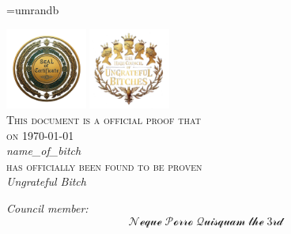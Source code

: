 \documentclass[landscape,a4paper,12pt]{article}
\def\bitchname{{name\_of\_bitch}} %
\def\dateofcert{\today} %
\def\nameofcouncilmember{{Neque\;Porro\;Quisquam\;the\;3rd}}
\begin{document}
\pagecolor{yellow!10}
\centering
\begin{minipage}{1.0\textwidth}
\font\border=umrandb
\generalframe
{\border {}} %
{\border {}} %
{\border {}} %
{\border {}} %
{\border {}} %
{\border {}} %
{\border {}} %
{\border {}} %
{\centering
  \includegraphics[width=0.2\textwidth]{seal_of_certification.png}
  \includegraphics[width=0.2\textwidth]{backgroundless_ungrateful.png}\\[0.5cm]
  \textsc{\Large This document is a official proof that}\\[0.5cm]
  \textsc{\Large on} {\Large {\dateofcert}}\\[1cm]
  
  {\huge \itshape \bitchname}\\[1cm]
  
  \textsc{\Large has officially been found to be proven}\\[1cm]
  
  {\LARGE \itshape Ungrateful Bitch}\\[1cm]
  
  \begin{minipage}{0.5\textwidth}
    \large
      \emph{Council member:}
      \LARGE{$$\mathcal{\nameofcouncilmember}$$}
      \vspace*{1cm}
  \end{minipage}
}
\end{minipage}
\end{document}
